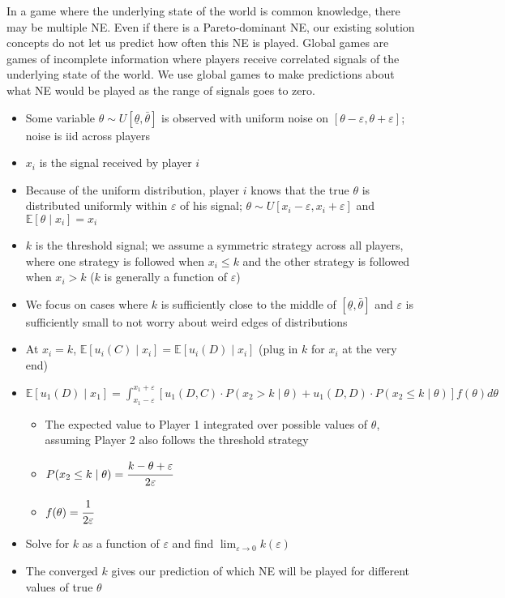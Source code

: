 \documentclass{report}
\begin{document}
In a game where the underlying state of the world is common knowledge, there may be multiple NE. Even if there is a Pareto-dominant NE, our existing solution concepts do not let us predict how often this NE is played. Global games are games of incomplete information where players receive correlated signals of the underlying state of the world. We use global games to make predictions about what NE would be played as the range of signals goes to zero. 
\begin{itemize}
	\item Some variable $\theta \sim U[\underline{\theta}, \bar{\theta}]$ is observed with uniform noise on $[\theta - \varepsilon, \theta + \varepsilon]$; noise is iid across players
	\item $x_i$ is the signal received by player $i$
	\item Because of the uniform distribution, player $i$ knows that the true $\theta$ is distributed uniformly within $\varepsilon$ of his signal; $\theta \sim U[x_i - \varepsilon, x_i + \varepsilon]$ and $\mathbb{E}[\theta \mid x_i] = x_i$
	\item $k$ is the threshold signal; we assume a symmetric strategy across all players, where one strategy is followed when $x_i \leq k$ and the other strategy is followed when $x_i > k$ ($k$ is generally a function of $\varepsilon$)
	\item We focus on cases where $k$ is sufficiently close to the middle of $[\underline{\theta}, \bar{\theta}]$ and $\varepsilon$ is sufficiently small to not worry about weird edges of distributions
	\item At $x_i = k$, $\mathbb{E}[u_i(C) \mid x_i]=\mathbb{E}[u_i(D) \mid x_i]$ (plug in $k$ for $x_i$ at the very end)
	\item $\mathbb{E}[u_1(D) \mid x_1] = \displaystyle\int_{x_1 - \varepsilon}^{x_1 + \varepsilon} \left[ u_1(D,C) \cdot P(x_2 > k \mid \theta) + u_1(D,D) \cdot P(x_2 \leq k \mid \theta) \right] f(\theta) d\theta$ 
		\begin{itemize}
		\item The expected value to Player 1 integrated over possible values of $\theta$, assuming Player 2 also follows the threshold strategy
		\item $P(x_2 \leq k \mid \theta) = \cfrac{k - \theta + \varepsilon}{2 \varepsilon}$
		\item $f(\theta) = \cfrac{1}{2\varepsilon}$
		\end{itemize}
	\item Solve for $k$ as a function of $\varepsilon$ and find $\displaystyle\lim_{\varepsilon \rightarrow 0} k(\varepsilon)$
	\item The converged $k$ gives our prediction of which NE will be played for different values of true $\theta$
\end{itemize}
\bigskip \bigskip
\end{document}
